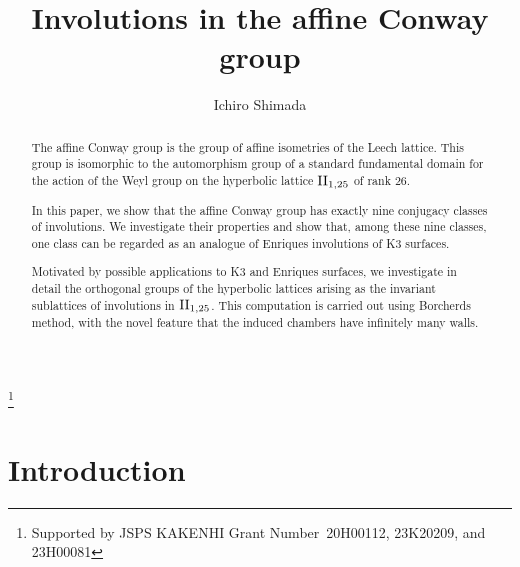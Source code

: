 \documentclass{amsart} %
\begin{document}
\title[Involutions in the affine Conway group]
{Involutions in the affine Conway group}

\author{Ichiro Shimada}
\address{Department of Mathematics,
Graduate School of Science,
Hiroshima University,
1-3-1 Kagamiyama,
Higashi-Hiroshima,
739-8526 JAPAN}
\thanks{Supported by JSPS KAKENHI Grant Number~20H00112, 23K20209, and 23H00081}



\begin{abstract}
The affine Conway group is  the group of affine isometries of the Leech lattice.
This group  is isomorphic to  the automorphism group of 
a standard  fundamental domain for the action of 
the Weyl group on the hyperbolic lattice $\mathrm{II}_{1, 25}$ of  rank $26$.
 \par
In this paper, we show that the affine Conway group has exactly nine conjugacy classes of involutions.
We investigate their  properties
and show that, 
among these nine classes, 
one class can be regarded as  an analogue of Enriques involutions of K3 surfaces.
 \par
Motivated by possible applications to K3 and Enriques surfaces, 
we investigate in detail the orthogonal groups of the hyperbolic lattices arising as the invariant sublattices of involutions in $\mathrm{II}_{1, 25}$.
This computation is carried out using Borcherds method, 
with the novel feature that the induced chambers have infinitely many walls.
\end{abstract}
%
\keywords{}
\maketitle
%
%
% 
\section{Introduction}
%
\end{document}
